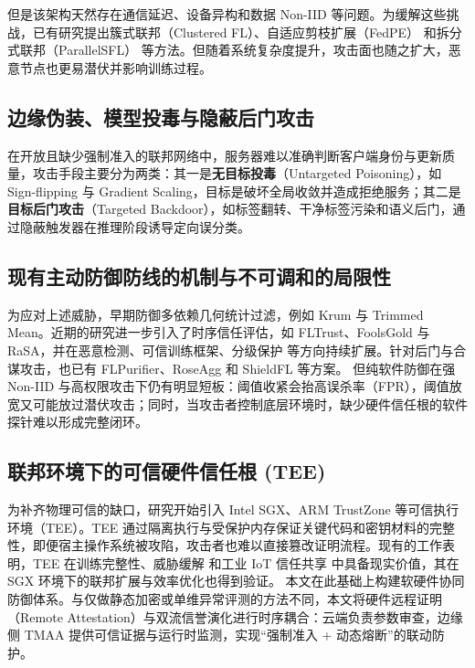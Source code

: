 \documentclass[11pt, a4paper, UTF8, fontset=fandol]{ctexart}
\begin{document}
但是该架构天然存在通信延迟、设备异构和数据 Non-IID 等问题。为缓解这些挑战，已有研究提出簇式联邦（Clustered FL）\cite{r9_clustered}、自适应剪枝扩展（FedPE）\cite{fedpe} 和拆分式联邦（ParallelSFL）\cite{parallelsfl} 等方法。但随着系统复杂度提升，攻击面也随之扩大，恶意节点也更易潜伏并影响训练过程。

\subsection{边缘伪装、模型投毒与隐蔽后门攻击}
在开放且缺少强制准入的联邦网络中，服务器难以准确判断客户端身份与更新质量，攻击手段主要分为两类：其一是\textbf{无目标投毒}（Untargeted Poisoning），如 Sign-flipping 与 Gradient Scaling，目标是破坏全局收敛并造成拒绝服务；其二是\textbf{目标后门攻击}（Targeted Backdoor），如标签翻转、干净标签污染和语义后门，通过隐蔽触发器在推理阶段诱导定向误分类。

\subsection{现有主动防御防线的机制与不可调和的局限性}
为应对上述威胁，早期防御多依赖几何统计过滤，例如 Krum\cite{blanchard2017krum} 与 Trimmed Mean\cite{yin2018byzantine}。近期的研究进一步引入了时序信任评估，如 FLTrust\cite{cao2021fltrust}、FoolsGold\cite{fung2020foolsgold} 与 RaSA\cite{wang2025rasa}，并在恶意检测\cite{dou2025toward}、可信训练框架\cite{lu2025tmt}、分级保护\cite{wang2024federated} 等方向持续扩展。针对后门与合谋攻击，也已有 FLPurifier\cite{flpurifier}、RoseAgg\cite{roseagg} 和 ShieldFL\cite{shieldfl} 等方案。
但纯软件防御在强 Non-IID 与高权限攻击下仍有明显短板：阈值收紧会抬高误杀率（FPR），阈值放宽又可能放过潜伏攻击；同时，当攻击者控制底层环境时，缺少硬件信任根的软件探针难以形成完整闭环。

\subsection{联邦环境下的可信硬件信任根 (TEE)}
为补齐物理可信的缺口，研究开始引入 Intel SGX、ARM TrustZone 等可信执行环境（TEE）。TEE 通过隔离执行与受保护内存保证关键代码和密钥材料的完整性，即便宿主操作系统被攻陷，攻击者也难以直接篡改证明流程\cite{zhang2025rppfl,liao2024verifiable}。现有的工作表明，TEE 在训练完整性\cite{r1_tee_integrity}、威胁缓解\cite{r5_tee_mitigating} 和工业 IoT 信任共享\cite{r12_iot_tee} 中具备现实价值，其在 SGX 环境下的联邦扩展与效率优化也得到验证\cite{xu2021distributed,yan2024efficient}。
本文在此基础上构建软硬件协同防御体系。与仅做静态加密或单维异常评测的方法不同，本文将硬件远程证明（Remote Attestation）与双流信誉演化进行时序耦合：云端负责参数审查，边缘侧 TMAA 提供可信证据与运行时监测，实现“强制准入 + 动态熔断”的联动防护。
\end{document}
